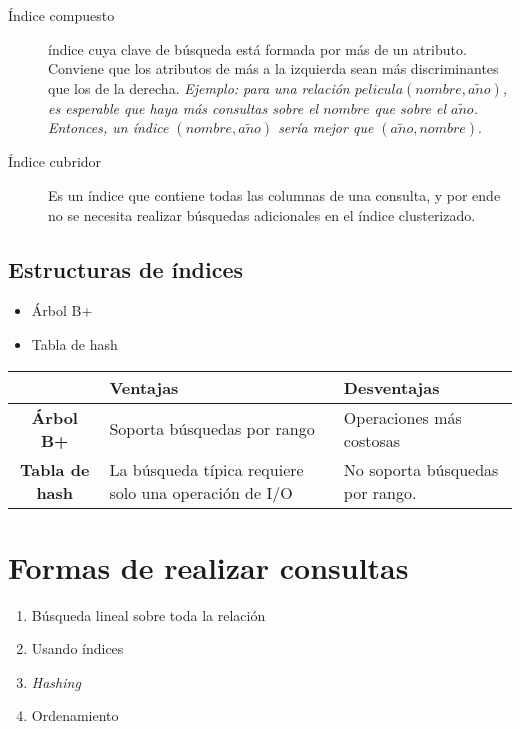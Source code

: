 \documentclass[a4paper, twoside]{article}
\begin{document}
\begin{description}
	\item[Índice compuesto] índice cuya clave de búsqueda está formada por más de un atributo. Conviene que los atributos de más a la izquierda sean más discriminantes que los de la derecha. \emph{Ejemplo: para una relación $pelicula(nombre,a\tilde{n}o)$, es esperable que haya más consultas sobre el $nombre$ que sobre el $a\tilde{n}o$. Entonces, un índice $(nombre,a\tilde{n}o)$ sería mejor que $(a\tilde{n}o,nombre).$}

	\item[Índice cubridor] Es un índice que contiene todas las columnas de una consulta, y por ende no se necesita realizar búsquedas adicionales en el índice clusterizado.
\end{description}

\subsection{Estructuras de índices}
\begin{itemize}
	\item Árbol B+
	\item Tabla de hash
\end{itemize}

\begin{center}
	\begin{tabular}{|c|p{5cm}|p{5cm}|}
		\hline 
		 & \textbf{Ventajas} & \textbf{Desventajas}\\
		\hline 
		\hline 
		\textbf{Árbol B+} & Soporta búsquedas por rango & Operaciones más costosas\\
		\hline 
		\textbf{Tabla de hash} & La búsqueda típica requiere solo una operación de I/O & No soporta búsquedas por rango. \\
		\hline 
	\end{tabular}
\end{center}


\section{Formas de realizar consultas}
\begin{enumerate}
	\item Búsqueda lineal sobre toda la relación
	\item Usando índices
	\item \emph{Hashing}
	\item Ordenamiento
\end{enumerate}
\end{document}
